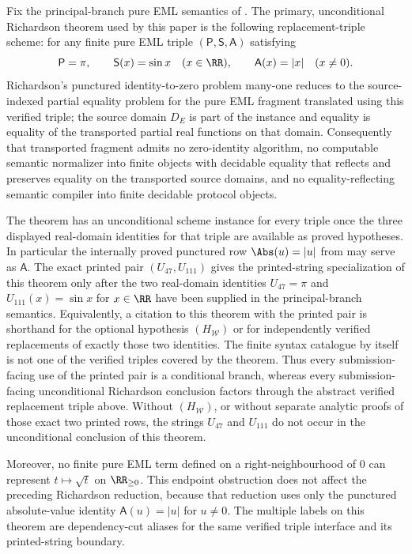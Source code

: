 \begin{theorem}
\label{thm:proc-ams-relative-richardson-theorem}
\label{thm:relative-richardson-main-spine-closure}
\label{thm:interface-only-richardson-spine}
\label{thm:printed-root-richardson-conditional-clause}
\label{thm:no-unconditional-printed-richardson-edge}
\label{thm:separation}
\label{thm:no-principal-branch-eml-nonnegative-root}
Fix the principal-branch pure EML semantics of .  The primary,
unconditional Richardson theorem used by this paper is the following
replacement-triple scheme: for any finite pure EML triple
\((\mathsf P,\mathsf S,\mathsf A)\) satisfying
\[
  \mathsf P=\pi,
  \qquad \mathsf S(x)=\sin x\quad(x\in\RR),
  \qquad \mathsf A(x)=|x|\quad(x\ne0).
\]
Richardson's punctured identity-to-zero problem many-one reduces to the
source-indexed partial equality problem for the pure EML fragment translated
using this verified triple; the source domain \(D_E\) is part of the instance and
equality is equality of the transported partial real functions on that domain.
Consequently that transported fragment admits no zero-identity algorithm, no
computable semantic normalizer into finite objects with decidable equality that
reflects and preserves equality on the transported source domains, and no
equality-reflecting semantic compiler into finite decidable protocol objects.

The theorem has an unconditional scheme instance for every triple once the three
displayed real-domain identities for that triple are available as proved
hypotheses.  In particular the internally proved punctured row \(\Abs(u)=|u|\) from
 may serve as \(\mathsf A\).  The exact
printed pair \((U_{47},U_{111})\) gives the printed-string specialization of this
theorem only after the two real-domain identities
\(U_{47}=\pi\) and \(U_{111}(x)=\sin x\) for \(x\in\RR\) have been supplied in
the principal-branch semantics.  Equivalently, a citation to this theorem with
the printed pair is shorthand for the optional hypothesis \((H_{\mathcal W})\)
or for independently verified replacements of exactly those two identities.  The
finite syntax catalogue by itself is not one of the verified triples covered by
the theorem.  Thus every submission-facing use of the printed pair is a
conditional branch, whereas every submission-facing unconditional Richardson
conclusion factors through the abstract verified replacement triple above.
Without \((H_{\mathcal W})\), or without separate analytic proofs of those exact
two printed rows, the strings \(U_{47}\) and \(U_{111}\) do not occur in the
unconditional conclusion of this theorem.

Moreover, no finite pure EML term defined on a right-neighbourhood of \(0\) can
represent \(t\mapsto\sqrt t\) on \(\RR_{\ge0}\).  This endpoint obstruction does
not affect the preceding Richardson reduction, because that reduction uses only
the punctured absolute-value identity \(\mathsf A(u)=|u|\) for \(u\ne0\).  The
multiple labels on this theorem are dependency-cut aliases for the same verified
triple interface and its printed-string boundary.
\end{theorem}

